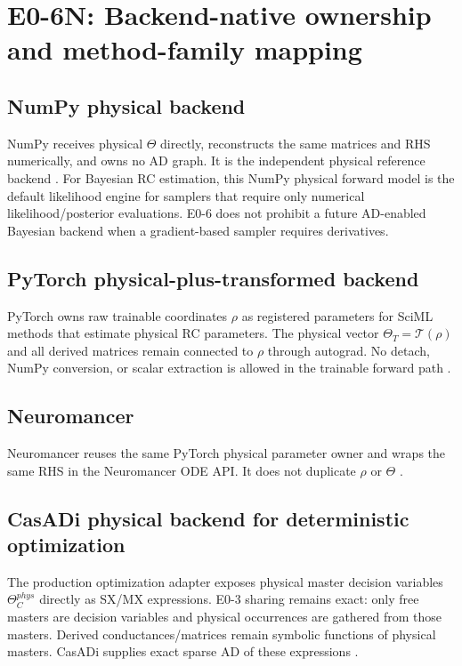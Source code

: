 \documentclass[11pt]{article}
\begin{document}
\section{E0-6N: Backend-native ownership and method-family mapping}

\subsection{NumPy physical backend}
NumPy receives physical $\Theta$ directly, reconstructs the same matrices and
RHS numerically, and owns no AD graph. It is the independent physical reference
backend \cite{Harris2020NumPy}. For Bayesian RC estimation, this NumPy physical
forward model is the default likelihood engine for samplers that require only
numerical likelihood/posterior evaluations. E0-6 does not prohibit a future
AD-enabled Bayesian backend when a gradient-based sampler requires derivatives.

\subsection{PyTorch physical-plus-transformed backend}
PyTorch owns raw trainable coordinates $\rho$ as registered parameters for
SciML methods that estimate physical RC parameters. The physical vector
$\Theta_T=\mathcal T(\rho)$ and all derived matrices remain connected to
$\rho$ through autograd. No detach, NumPy conversion, or scalar extraction is
allowed in the trainable forward path \cite{Paszke2019PyTorch,
PyTorchParameterDocs2026}.

\subsection{Neuromancer}
Neuromancer reuses the same PyTorch physical parameter owner and wraps the same
RHS in the Neuromancer ODE API. It does not duplicate $\rho$ or $\Theta$
\cite{Neuromancer2023,NeuromancerDocs2026}.

\subsection{CasADi physical backend for deterministic optimization}
The production optimization adapter exposes physical master decision variables
$\Theta_C^{phys}$ directly as SX/MX expressions. E0-3 sharing remains exact:
only free masters are decision variables and physical occurrences are gathered
from those masters. Derived conductances/matrices remain symbolic functions of
physical masters. CasADi supplies exact sparse AD of these expressions
\cite{Andersson2019CasADi,CasADiDocs2026}.
\end{document}
